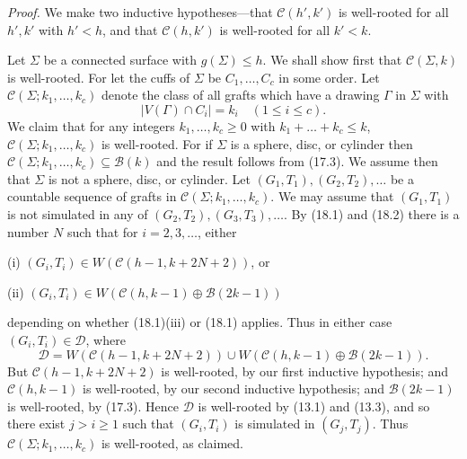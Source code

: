 \textit{Proof.} We make two inductive hypotheses---that $\mathcal{C}(h', k')$ is well-rooted for all $h', k'$ with $h' < h$, and that $\mathcal{C}(h, k')$ is well-rooted for all $k' < k$.

Let $\Sigma$ be a connected surface with $g(\Sigma) \le h$. We shall show first that $\mathcal{C}(\Sigma, k)$ is well-rooted. For let the cuffs of $\Sigma$ be $C_1, \dots, C_c$ in some order. Let $\mathcal{C}(\Sigma; k_1, \dots, k_c)$ denote the class of all grafts which have a drawing $\Gamma$ in $\Sigma$ with
\begin{equation*}
|V(\Gamma) \cap C_i| = k_i \quad (1 \le i \le c).
\end{equation*}
We claim that for any integers $k_1, \dots, k_c \ge 0$ with $k_1 + \dots + k_c \le k$, $\mathcal{C}(\Sigma; k_1, \dots, k_c)$ is well-rooted. For if $\Sigma$ is a sphere, disc, or cylinder then $\mathcal{C}(\Sigma; k_1, \dots, k_c) \subseteq \mathcal{B}(k)$ and the result follows from (17.3). We assume then that $\Sigma$ is not a sphere, disc, or cylinder. Let $(G_1, T_1), (G_2, T_2), \dots$ be a countable sequence of grafts in $\mathcal{C}(\Sigma; k_1, \dots, k_c)$. We may assume that $(G_1, T_1)$ is not simulated in any of $(G_2, T_2), (G_3, T_3), \dots$. By (18.1) and (18.2) there is a number $N$ such that for $i = 2, 3, \dots$, either

\hspace*{12pt}(i) $(G_i, T_i) \in W(\mathcal{C}(h - 1, k + 2N + 2))$, or

\hspace*{12pt}(ii) $(G_i, T_i) \in W(\mathcal{C}(h, k - 1) \oplus \mathcal{B}(2k - 1))$

depending on whether (18.1)(iii) or (18.1) applies. Thus in either case $(G_i, T_i) \in \mathcal{D}$, where
\begin{equation*}
\mathcal{D} = W(\mathcal{C}(h - 1, k + 2N + 2)) \cup W(\mathcal{C}(h, k - 1) \oplus \mathcal{B}(2k - 1)).
\end{equation*}
But $\mathcal{C}(h - 1, k + 2N + 2)$ is well-rooted, by our first inductive hypothesis; and $\mathcal{C}(h, k - 1)$ is well-rooted, by our second inductive hypothesis; and $\mathcal{B}(2k - 1)$ is well-rooted, by (17.3). Hence $\mathcal{D}$ is well-rooted by (13.1) and (13.3), and so there exist $j > i \ge 1$ such that $(G_i, T_i)$ is simulated in $(G_j, T_j)$. Thus $\mathcal{C}(\Sigma; k_1, \dots, k_c)$ is well-rooted, as claimed.

